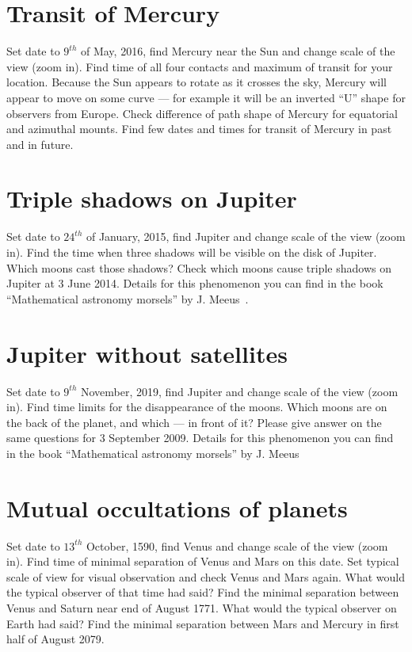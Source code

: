 \section{Transit of Mercury}
\label{sec:Exercises:TransitOfMercury}

Set date to $9^{th}$ of May, 2016, find Mercury near the Sun and 
change scale of the view (zoom in). Find time of all four contacts and 
maximum of transit for your location. Because the Sun appears 
to rotate as it crosses the sky, Mercury will appear to move 
on some curve --- for example it will be an inverted ``U'' shape 
for observers from Europe. Check difference of path shape of 
Mercury for equatorial and azimuthal mounts. Find few dates and 
times for transit of Mercury in past and in future.

\section{Triple shadows on Jupiter}
\label{sec:Exercises:TripleShadowsOnJupiter}

Set date to $24^{th}$ of January, 2015, find Jupiter and change 
scale of the view (zoom in). Find the time when three shadows will be 
visible on the disk of Jupiter. Which moons cast those shadows? 
Check which moons cause triple shadows on Jupiter at 3 
June 2014. Details for this phenomenon you can find in the book 
``Mathematical astronomy morsels'' by J. Meeus~\cite{MeeusAstMorsels}.

\section{Jupiter without satellites}
\label{sec:Exercises:JupiterWithoutSatellites}

Set date to $9^{th}$ November, 2019, find Jupiter and change 
scale of the view (zoom in). Find time limits for the disappearance 
of the moons. Which moons are on the back of the planet, and 
which --- in front of it? Please give answer on the same 
questions for 3 September 2009. Details for this phenomenon 
you can find in the book ``Mathematical astronomy morsels'' by 
J. Meeus~\cite{MeeusAstMorsels}

\section{Mutual occultations of planets}
\label{sec:Exercises:MutualOccultationsOfPlanets}

Set date to $13^{th}$ October, 1590, find Venus and change 
scale of the view (zoom in). Find time of minimal separation of 
Venus and Mars on this date. Set typical scale of view 
for visual observation and check Venus and Mars again. 
What would the typical observer of that time had said? Find 
the minimal separation between Venus and Saturn near end 
of August 1771. What would the typical observer on 
Earth had said? Find the minimal separation between Mars and 
Mercury in first half of August 2079. 

